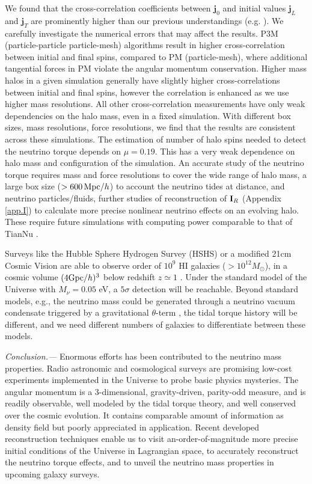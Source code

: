 \documentclass[aps,prd,twocolumn,amsmath,amssymb,amsfont,superscriptaddress,nofootinbib]{revtex4-1}
\newcommand{\bs}{\boldsymbol}
\newcommand{\I}{\bold{I}}
\newcommand{\spin}{\bs{j}}
\begin{document}
We found that the cross-correlation coefficients between $\spin_0$ and initial values $\spin_L$ and $\spin_T$ are prominently higher than our previous understandings (e.g. \citep{2000ApJ...532L...5L}). 
We carefully investigate the numerical errors that may affect the results. 
P3M (particle-particle particle-mesh) algorithms result in higher cross-correlation between initial and final spins, compared to PM (particle-mesh), where additional tangential forces in PM violate the angular momentum conservation. 
Higher mass halos in a given simulation generally have slightly higher cross-correlations between initial and final spins, however the correlation is enhanced as we use higher mass resolutions. 
All other cross-correlation measurements have only weak dependencies on the halo mass, even in a fixed simulation. 
With different box sizes, mass resolutions, force resolutions, we find that the results are consistent across these simulations. 
The estimation of number of halo spins needed to detect the neutrino torque depends on $\mu=0.19$. This has a very weak dependence on halo mass and configuration of the simulation. An accurate study of the neutrino torque requires mass and force resolutions to cover the wide range of halo mass, a large box size ($>600\,{\rm Mpc}/h$) to account the neutrino tides at distance, and neutrino particles/fluids, further studies of reconstruction of $\I_R$ (Appendix \ref{app.I}) to calculate more precise nonlinear neutrino effects on an evolving halo. These require future simulations with computing power comparable to that of TianNu \citep{2017NatAs...1E.143Y,2017RAA....17...85E}.

Surveys like the Hubble Sphere Hydrogen Survey (HSHS) \citep{2006astro.ph..6104P} or a modified 21cm Cosmic Vision \citep{2018arXiv180207216D} are able to observe order of $10^9$ HI galaxies ($>10^{12}M_\odot$), 
in a cosmic volume $(4{\rm Gpc}/h)^3$ below redshift $z\simeq 1$ \citep{2004MNRAS.350.1210Z}. 
Under the standard model of the Universe with $M_\nu=0.05$ eV, a $5\sigma$ detection will be reachable.
Beyond standard models, e.g., the neutrino mass could be
generated through a neutrino vacuum condensate triggered by a gravitational $\theta$-term
\citep{2016PhRvD..93k3002D}, the tidal torque history will be different, 
and we need different numbers of galaxies to differentiate between these models.


\textit{Conclusion.---}
Enormous efforts has been contributed to the neutrino mass properties.
Radio astronomic and cosmological surveys are promising low-cost experiments implemented in the Universe to probe basic physics mysteries. 
The angular momentum is a 3-dimensional, gravity-driven, parity-odd measure, 
and is readily observable, well modeled by the tidal torque theory, and well conserved over the cosmic evolution.
It contains comparable amount of information as density field but poorly appreciated in application.
Recent developed reconstruction techniques enable us to visit an-order-of-magnitude more precise initial conditions of the Universe in Lagrangian space, 
to accurately reconstruct the neutrino torque effects,
and to unveil the neutrino mass properties in upcoming galaxy surveys.
\end{document}
